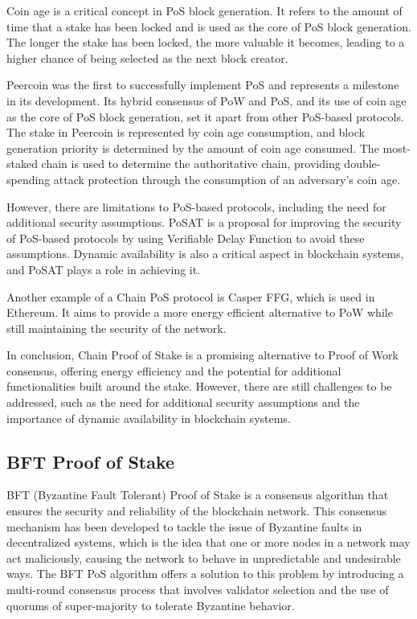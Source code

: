 Coin age is a critical concept in PoS block generation. It refers to the amount of time that a stake has been locked and is used as the core of PoS block generation. The longer the stake has been locked, the more valuable it becomes, leading to a higher chance of being selected as the next block creator.

Peercoin was the first to successfully implement PoS and represents a milestone in its development. Its hybrid consensus of PoW and PoS, and its use of coin age as the core of PoS block generation, set it apart from other PoS-based protocols. The stake in Peercoin is represented by coin age consumption, and block generation priority is determined by the amount of coin age consumed. The most-staked chain is used to determine the authoritative chain, providing double-spending attack protection through the consumption of an adversary's coin age.

However, there are limitations to PoS-based protocols, including the need for additional security assumptions. PoSAT is a proposal for improving the security of PoS-based protocols by using Verifiable Delay Function to avoid these assumptions. Dynamic availability is also a critical aspect in blockchain systems, and PoSAT plays a role in achieving it.

Another example of a Chain PoS protocol is Casper FFG, which is used in Ethereum. It aims to provide a more energy efficient alternative to PoW while still maintaining the security of the network.

In conclusion, Chain Proof of Stake is a promising alternative to Proof of Work consensus, offering energy efficiency and the potential for additional functionalities built around the stake. However, there are still challenges to be addressed, such as the need for additional security assumptions and the importance of dynamic availability in blockchain systems.


\subsection*{\textbf{BFT Proof of Stake}}

BFT (Byzantine Fault Tolerant) Proof of Stake is a consensus algorithm that ensures the security and reliability of the blockchain network. This consensus mechanism has been developed to tackle the issue of Byzantine faults in decentralized systems, which is the idea that one or more nodes in a network may act maliciously, causing the network to behave in unpredictable and undesirable ways. The BFT PoS algorithm offers a solution to this problem by introducing a multi-round consensus process that involves validator selection and the use of quorums of super-majority to tolerate Byzantine behavior.

